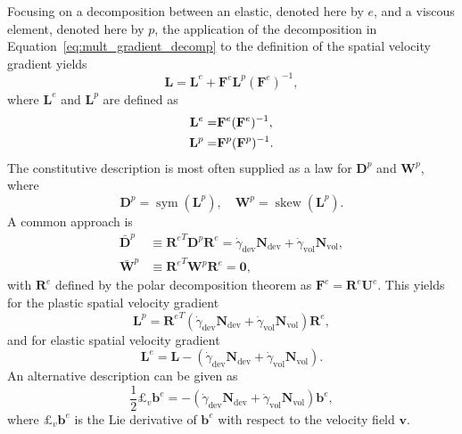 Focusing on a decomposition between an elastic, denoted here by $e$, and a viscous element, denoted here by $p$, the application of the decomposition in Equation~\eqref{eq:mult_gradient_decomp} to the definition of the spatial velocity gradient yields
\begin{equation}
	\mathbf L = \mathbf L^e + \mathbf F^e \mathbf L^p (\mathbf F^e)^{-1},
\end{equation}
where $\mathbf L^e$ and $\mathbf L^p$ are defined as
\begin{align}
	\mathbf L^e =&  \do{\mathbf F}^e(\mathbf F^e)^{-1},\\
	\mathbf L^p =&  \do{\mathbf F}^p(\mathbf F^p)^{-1}.
\end{align}
The constitutive description is most often supplied as a law for $\mathbf D^p$ and $\mathbf W^p$, where
\begin{equation}
	\mathbf D^p = \operatorname{sym}(\mathbf L^p),\quad \mathbf W^p = \operatorname{skew}(\mathbf L^p).
\end{equation}
A common approach is \citep{desouzanetoComputationalMethodsPlasticity2008}
\begin{align}
  \label{eq:rate_plasticity_de_souza}
	\bar{\mathbf D}^p &\equiv  {\mathbf R^e}^T \mathbf D^p \mathbf R^e  = \dot\gamma_\text{dev} \mathbf N_\text{dev} + \dot\gamma_\text{vol} \mathbf N_\text{vol},\\
	\bar{\mathbf W}^p &\equiv {\mathbf R^e}^T \mathbf W^p \mathbf R^e = \bm 0,
\end{align}
with $\mathbf R^e$ defined by the polar decomposition theorem as $\mathbf F^e = \mathbf R^e\mathbf U^e$.
This yields for the plastic spatial velocity gradient
\begin{equation}
	\mathbf L^p = {\mathbf R^e}^T(\dot\gamma_\text{dev} \mathbf N_\text{dev} + \dot\gamma_\text{vol} \mathbf N_\text{vol})\mathbf R^e,
\end{equation}
and for elastic spatial velocity gradient
\begin{equation}
	\mathbf L^e = \mathbf L - (\dot\gamma_\text{dev} \mathbf N_\text{dev} + \dot\gamma_\text{vol} \mathbf N_\text{vol}).
\end{equation}
An alternative description can be given as
\begin{equation}
	\frac{1}{2}£_v \mathbf b^e = -(\dot\gamma_\text{dev} \mathbf N_\text{dev} + \dot\gamma_\text{vol} \mathbf N_\text{vol})\mathbf b^e,
\end{equation}
where $£_v \mathbf b^e$ is the Lie derivative of $\mathbf b^e$ with respect to the velocity field $\bm v$.

